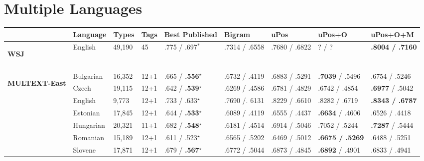 \section{Multiple Languages}
\begin{table}[h]
  \small
  \begin{flushleft}
  \begin{tabular}{|l|l|l|l|l|l|l|l|l|}
        \hline
        & Language   & Types   & Tags & Best Published            & Bigram &uPos           & uPos+O            & uPos+O+M     \\ \hline %
        \multirow{1}{*}{\begin{sideways}\textbf{WSJ}\end{sideways}} 
        & English    & 49,190  & 45 & .775 / .697$^*$  &.7314 / .6558 & .7680 / .6822 & ? / ? & \textbf{.8004 / .7160}           \\
        & & & & & & & &\\ \hline
        \multirow{8}{*}{\begin{sideways}\textbf{MULTEXT-East}\end{sideways}} & 
        Bulgarian    & 16,352  & 12+1 & .665 / \textbf{.556}$^\star$    & .6732 / .4119 & .6883 / .5291 & \textbf{.7039} / .5496     & .6754 / .5246 \\
        & Czech      & 19,115  & 12+1 & .642 / \textbf{.539}$^\star$    & .6269 / .4586 & .6781 / .4829 & .6742 / .4854     & \textbf{.6977} / .5042 \\
        & English    & 9,773   & 12+1 & .733 / .633$^\star$    & .7690 /. 6131 & .8229 / .6610 & .8282 / .6719     & \textbf{.8343 / .6787} \\
        & Estonian   & 17,845  & 12+1 & .644 / \textbf{.533}$^\star$    & .6089 / .4119 & .6555 / .4437 & \textbf{.6634} / .4606     & .6526 / .4418 \\
        & Hungarian  & 20,321  & 11+1 & .682 / \textbf{.548}$^\star$    & .6181 / .4514 & .6914 / .5046 & .7052 / .5244     & \textbf{.7287} / .5444 \\
        & Romanian   & 15,189  & 12+1 & .611 / .523$^\star$    & .6565 / .5202 & .6469 / .5012 & \textbf{.6675 / .5269}     & .6488 / .5251 \\
        & Slovene    & 17,871  & 12+1 & .679 / \textbf{.567}$^\star$    & .6772 / .5044 & .6873 / .4845 & \textbf{.6892} / .4901     & .6833 / .4941 \\

\end{tabular}
\end{flushleft}
\end{table}
